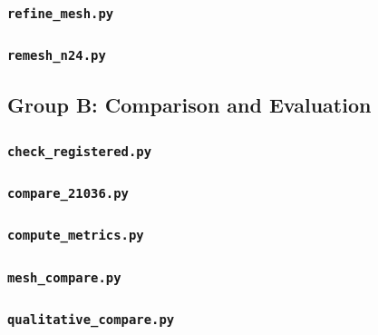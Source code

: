 \documentclass[12pt]{article}
\begin{document}
\subsubsection{\texttt{refine\_mesh.py}}


\subsubsection{\texttt{remesh\_n24.py}}


\subsection{Group B: Comparison and Evaluation}

\subsubsection{\texttt{check\_registered.py}}


\subsubsection{\texttt{compare\_21036.py}}


\subsubsection{\texttt{compute\_metrics.py}}


\subsubsection{\texttt{mesh\_compare.py}}


\subsubsection{\texttt{qualitative\_compare.py}}

\end{document}
